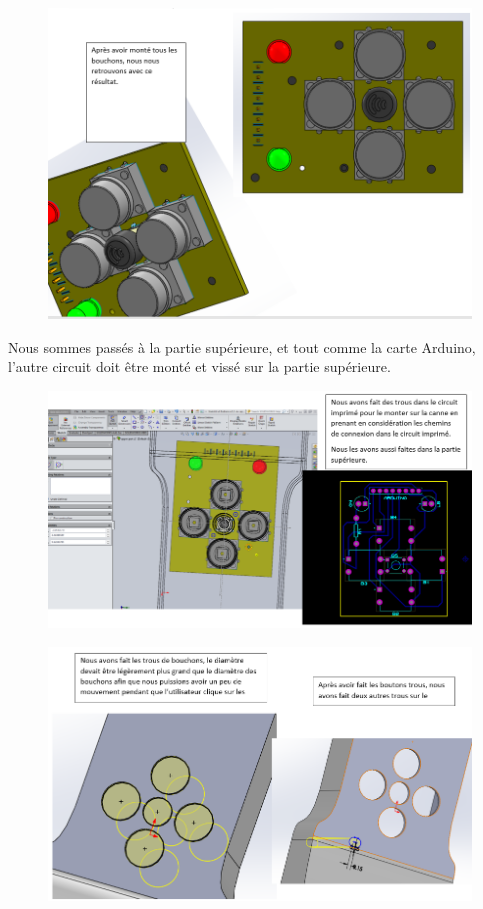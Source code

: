 \begin{figure}[!htbp]
    \centering
    \includegraphics[width=\linewidth]{assets/conception1/26.png}
\end{figure}

\FloatBarrier

Nous sommes passés à la partie supérieure, et tout comme la carte Arduino, l’autre circuit doit être monté et vissé sur la partie supérieure.  

\begin{figure}[!htbp]
    \centering
    \includegraphics[width=\linewidth]{assets/conception1/27.png}
\end{figure}

\FloatBarrier

\begin{figure}[!htbp]
    \centering
    \includegraphics[width=\linewidth]{assets/conception1/28.png}
\end{figure}

